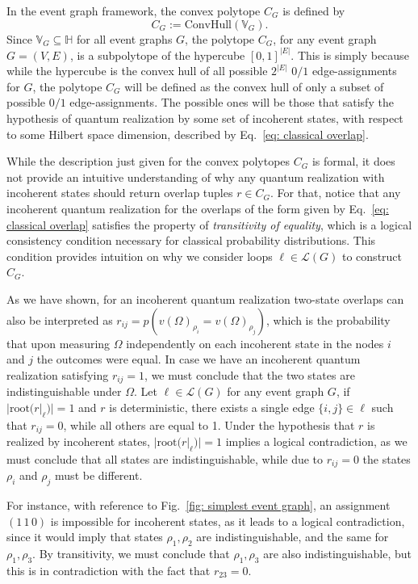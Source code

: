 \documentclass[a4paper,twocolumn,11pt,accepted=2024-01-17]{quantumarticle}
\begin{document}
{\begin{equation*}
\end{equation*}
In the event graph framework, the convex polytope $C_G$ is defined by 
\begin{equation}
    C_G := \text{ConvHull}(\mathbb{V}_G).
\end{equation}
Since $\mathbb{V}_G \subseteq \mathbb{H}$ for all event graphs $G$, the polytope $C_G$, for any event graph $G = (V,E)$, is a subpolytope of the hypercube $[0,1]^{|E|}$. This is simply because while the hypercube is the convex hull of all possible $2^{|E|}$ $0/1$ edge-assignments for $G$, the polytope $C_G$ will be defined as the convex hull of only a subset of possible $0/1$ edge-assignments. The possible ones will be those that satisfy the hypothesis of quantum realization by some set of incoherent states, with respect to some Hilbert space dimension, described by Eq.~\eqref{eq: classical overlap}.
}

{
While the description just given for the convex polytopes $C_G$ is formal, it does not provide an intuitive understanding of why any quantum realization with incoherent states should return overlap tuples $r \in C_G$. For that, notice that any incoherent quantum realization for the overlaps of the form given by Eq.~\eqref{eq: classical overlap} satisfies the property of \textit{transitivity of equality}, which is a logical consistency condition necessary for classical probability distributions. This condition provides intuition on why we consider loops $\ell \in \mathcal{L}(G)$ to construct $C_G$. 

As we have shown, for an incoherent quantum realization two-state overlaps can also be interpreted as $r_{ij} = p(v(\Omega)_{\rho_i} = v(\Omega)_{\rho_j})$, which is the probability that upon measuring $\Omega$ independently on each incoherent state in the nodes $i$ and $j$ the outcomes were equal. In case we have an incoherent quantum realization satisfying $r_{ij}=1$, we must conclude that the two states are indistinguishable under $\Omega$. Let $\ell \in \mathcal{L}(G)$ for any event graph $G$, if $|\text{root}(r|_{\ell})| = 1$ and $r$ is deterministic, there exists a single edge $\{i,j\} \in \ell$ such that $r_{ij}=0$, while all others are equal to 1. Under the hypothesis that $r$ is realized by incoherent states, $|\text{root}(r|_{\ell})| = 1$ implies a logical contradiction, as we must conclude that all states are indistinguishable, while due to $r_{ij}=0$ the states $\rho_i$ and $\rho_j$ must be different.  
} For instance, with reference to Fig.~\ref{fig: simplest event graph}, an assignment $(1\,1\,0)$ is impossible for incoherent states, as it leads to a logical contradiction{, since it would imply that states $\rho_1,\rho_2$ are indistinguishable, and the same for  $\rho_1,\rho_3$. By transitivity, we must conclude that $\rho_1,\rho_3$ are also indistinguishable, but this is in contradiction with the fact that $r_{23}=0$}.
\end{document}
